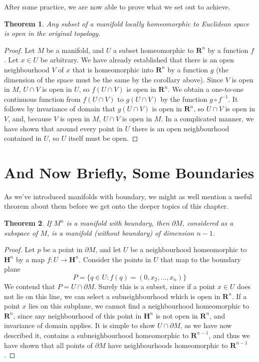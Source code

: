 \documentclass[12pt]{report}
\theoremstyle{plain}
\newtheorem{theorem}{Theorem}[chapter]
\theoremstyle{definition}
\begin{document}
After some practice, we are now able to prove what we set out to achieve.

\begin{theorem}
    Any subset of a manifold locally homeomorphic to Euclidean space is open in the original topology.
\end{theorem}
\begin{proof}
    Let $M$ be a manifold, and $U$ a subset homeomorphic to $\mathbf{R}^n$ by a function $f$. Let $x \in U$ be arbitrary. We have already established that there is an open neighbourhood $V$ of $x$ that is homeomorphic into $\mathbf{R}^n$ by a function $g$ (the dimension of the space must be the same by the corollary above). Since $V$ is open in $M$, $U \cap V$ is open in $U$, so $f(U \cap V)$ is open in $\mathbf{R}^n$. We obtain a one-to-one continuous function from $f(U \cap V)$ to $g(U \cap V)$ by the function $g \circ f^{-1}$. It follows by invariance of domain that $g(U \cap V)$ is open in $\mathbf{R}^n$, so $U \cap V$ is open in $V$, and, because $V$ is open in $M$, $U \cap V$ is open in $M$. In a complicated manner, we have shown that around every point in $U$ there is an open neighbourhood contained in $U$, so $U$ itself must be open.
\end{proof}

\section{And Now Briefly, Some Boundaries}

As we've introduced manifolds with boundary, we might as well mention a useful theorem about them before we get onto the deeper topics of this chapter.

\begin{theorem}
    If $M^n$ is a manifold with boundary, then $\partial M$, considered as a subspace of $M$, is a manifold (without boundary) of dimension $n-1$.
\end{theorem}
\begin{proof}
    Let $p$ be a point in $\partial M$, and let $U$ be a neighbourhood homeomorphic to $\mathbf{H}^n$ by a map $f:U \to \mathbf{H}^n$. Consider the points in $U$ that map to the boundary plane
    \[ P = \{ q \in U : f(q) = (0,x_2, \dots, x_n) \} \]
    We contend that $P = U \cap \partial M$. Surely this is a subset, since if a point $x \in U$ does not lie on this line, we can select a subneighbourhood which is open in $\mathbf{R}^n$. If a point $x$ lies on this subplane, we cannot find a neighbourhood homeomorphic to $\mathbf{R}^n$, since any neighbourhood of this point in $\mathbf{H}^n$ is not open in $\mathbf{R}^n$, and invariance of domain applies. It is simple to show $U \cap \partial M$, as we have now described it, contains a subneighbourhood homeomorphic to $\mathbf{R}^{n-1}$, and thus we have shown that all points of $\partial M$ have neighbourhoods homeomorphic to $\mathbf{R}^{n-1}$.
\end{proof}
\end{document}
